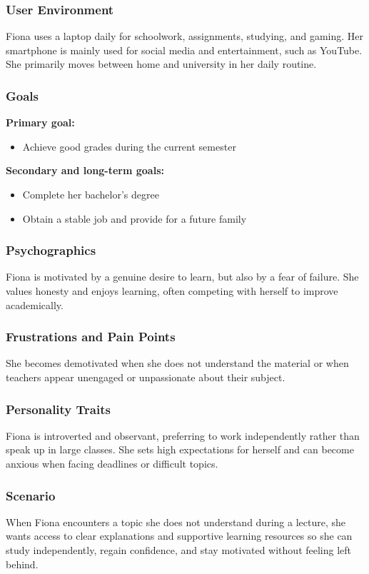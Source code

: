 \subsubsection{User Environment}
Fiona uses a laptop daily for schoolwork, assignments, studying, and gaming.
Her smartphone is mainly used for social media and entertainment, such as YouTube.
She primarily moves between home and university in her daily routine.

\subsubsection{Goals}
\textbf{Primary goal:}
\begin{itemize}
    \item Achieve good grades during the current semester
\end{itemize}

\textbf{Secondary and long-term goals:}
\begin{itemize}
    \item Complete her bachelor’s degree
    \item Obtain a stable job and provide for a future family
\end{itemize}

\subsubsection{Psychographics}
Fiona is motivated by a genuine desire to learn, but also by a fear of failure.
She values honesty and enjoys learning, often competing with herself to improve academically.

\subsubsection{Frustrations and Pain Points}
She becomes demotivated when she does not understand the material or when teachers appear unengaged or unpassionate about their subject.

\subsubsection{Personality Traits}
Fiona is introverted and observant, preferring to work independently rather than speak up in large classes.
She sets high expectations for herself and can become anxious when facing deadlines or difficult topics.

\subsubsection{Scenario}
When Fiona encounters a topic she does not understand during a lecture, she wants access to clear explanations and supportive learning resources so she can study independently, regain confidence, and stay motivated without feeling left behind.


